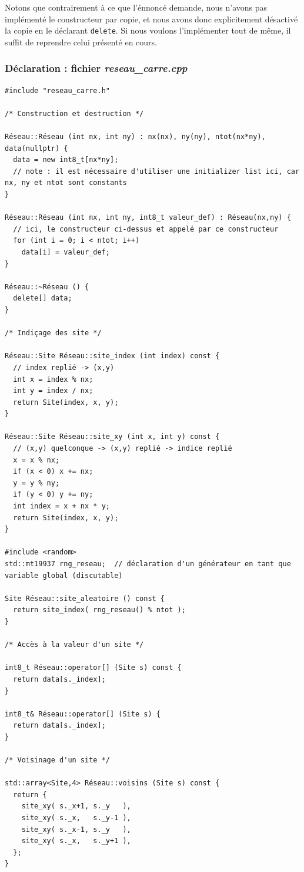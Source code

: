 \documentclass{book}
\newcommand{\inline}[1]{\texttt{#1}}
\def\filename{\emph}
\begin{document}
\begin{correction}
Notons que contrairement à ce que l'énnoncé demande, nous n'avons pas implémenté le constructeur par copie, et nous avons donc explicitement désactivé la copie en le déclarant \inline{delete}. Si nous voulons l'implémenter tout de même, il suffit de reprendre celui présenté en cours.

\subsubsection*{Déclaration : fichier \filename{reseau\_carre.cpp}}

\begin{verbatim}
#include "reseau_carre.h"

/* Construction et destruction */

Réseau::Réseau (int nx, int ny) : nx(nx), ny(ny), ntot(nx*ny), data(nullptr) {
  data = new int8_t[nx*ny];
  // note : il est nécessaire d'utiliser une initializer list ici, car nx, ny et ntot sont constants
}

Réseau::Réseau (int nx, int ny, int8_t valeur_def) : Réseau(nx,ny) {
  // ici, le constructeur ci-dessus et appelé par ce constructeur
  for (int i = 0; i < ntot; i++)
    data[i] = valeur_def;
}

Réseau::~Réseau () {
  delete[] data;
}

/* Indiçage des site */

Réseau::Site Réseau::site_index (int index) const {
  // index replié -> (x,y)
  int x = index % nx;
  int y = index / nx;
  return Site(index, x, y);
}

Réseau::Site Réseau::site_xy (int x, int y) const {
  // (x,y) quelconque -> (x,y) replié -> indice replié
  x = x % nx;
  if (x < 0) x += nx;
  y = y % ny;
  if (y < 0) y += ny;
  int index = x + nx * y;
  return Site(index, x, y);
}

#include <random>
std::mt19937 rng_reseau;  // déclaration d'un générateur en tant que variable global (discutable)

Site Réseau::site_aleatoire () const {
  return site_index( rng_reseau() % ntot );
}

/* Accès à la valeur d'un site */

int8_t Réseau::operator[] (Site s) const {
  return data[s._index];
}

int8_t& Réseau::operator[] (Site s) {
  return data[s._index];
}

/* Voisinage d'un site */

std::array<Site,4> Réseau::voisins (Site s) const {
  return {
    site_xy( s._x+1, s._y   ),
    site_xy( s._x,   s._y-1 ),
    site_xy( s._x-1, s._y   ),
    site_xy( s._x,   s._y+1 ),
  };
}
\end{verbatim}


\end{correction}
\end{document}
